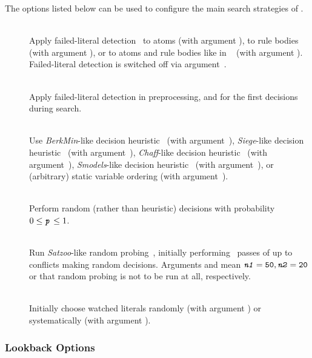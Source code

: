 The options listed below can be used to configure the main search
strategies of \clasp.
%
\begin{description}
\item[]~\\
Apply failed-literal detection~\cite{freeman95a}
to atoms (with argument ),
to rule bodies (with argument ), or
to atoms and rule bodies like in \nomorepp~\cite{angelinesc05c} (with argument ).
Failed-literal detection is switched off via argument~.
\item[]~\\
Apply failed-literal detection in preprocessing,
and for the first  decisions during search.
\item[]~\\
Use \emph{BerkMin}-like decision heuristic~\cite{golnov02a}
(with argument~),
\emph{Siege}-like decision heuristic~\cite{ryan04a}
(with argument~),
\emph{Chaff}-like decision heuristic~\cite{momazhzhma01a}
(with argument~),
\emph{Smodels}-like decision heuristic~\cite{siniso02a}
(with argument~),
or (arbitrary) static variable ordering
(with argument~).
\item[]~\\
Perform random (rather than heuristic) decisions
with probability $0\leq\texttt{\textit{p}}\leq 1$.
\item[]~\\
Run \emph{Satzoo}-like random probing~\cite{een03a},
initially performing~ passes of up to~ conflicts
making random decisions.
Arguments  and  mean
$\code{\textit{n1}}=\code{50},\linebreak[1]\code{\textit{n2}}=\code{20}$
or that random probing is not to be run at all, respectively.
\item[]~\\
Initially choose watched literals randomly (with argument )
or systematically (with argument ).
\end{description}

\subsubsection{Lookback Options}\label{subsec:clasp:back}

